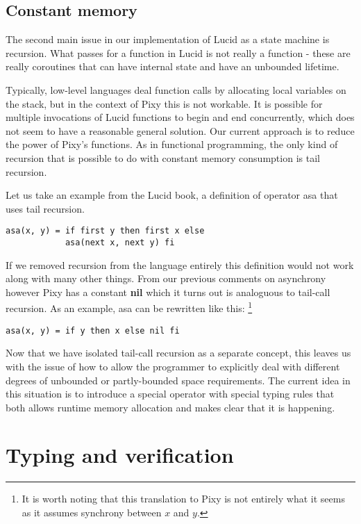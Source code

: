 \documentclass{scrartcl}
\begin{document}
    \subsection{Constant memory}
    
    The second main issue in our implementation of Lucid as a state machine is recursion. What passes for a function in Lucid is not really a function - these are really coroutines that can have internal state and have an unbounded lifetime.
    
    Typically, low-level languages deal function calls by allocating local variables on the stack, but in the context of Pixy this is not workable. It is possible for multiple invocations of Lucid functions to begin and end concurrently, which does not seem to have a reasonable general solution. Our current approach is to reduce the power of Pixy's functions. As in functional programming, the only kind of recursion that is possible to do with constant memory consumption is tail recursion.
    
    Let us take an example from the Lucid book, a definition of operator asa that uses tail recursion.
    \begin{lstlisting}
asa(x, y) = if first y then first x else
            asa(next x, next y) fi
    \end{lstlisting}
    
    If we removed recursion from the language entirely this definition would not work along with many other things. From our previous comments on asynchrony however Pixy has a constant \textbf{nil} which it turns out is analoguous to tail-call recursion. As an example, asa can be rewritten like this:
    \footnote{It is worth noting that this translation to Pixy is not entirely what it seems as it assumes synchrony between $x$ and $y$.}
    \begin{lstlisting}
asa(x, y) = if y then x else nil fi
    \end{lstlisting}
    
    Now that we have isolated tail-call recursion as a separate concept, this leaves us with the issue of how to allow the programmer to explicitly deal with different degrees of unbounded or partly-bounded space requirements. The current idea in this situation is to introduce a special operator with special typing rules that both allows runtime memory allocation and makes clear that it is happening.
    
    \section{Typing and verification}
\end{document}
